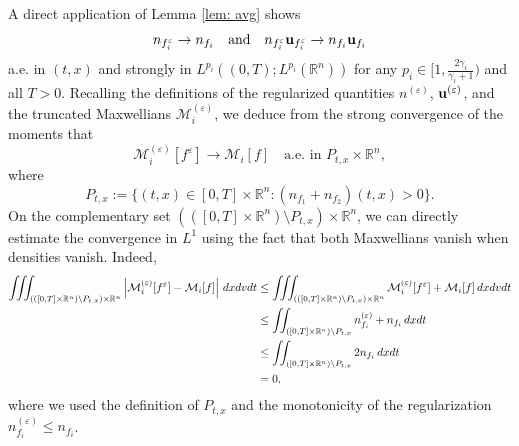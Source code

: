\documentclass[10pt,reqno]{amsart}
\numberwithin{equation}{section}
\newcommand{\R}{\mathbb R}
\newcommand{\calM}{\mathcal M}
\newcommand{\ve}{\varepsilon}
\begin{document}
A direct application of Lemma \ref{lem: avg} shows
\[
   n_{f_i^\ve} \to n_{f_i} \quad \mbox{and} \quad n_{f_i^\ve} {\bf{u}}_{f_i^\ve} \to n_{f_i} {\bf{u}}_{f_i}
\]
a.e. in $(t,x)$ and strongly in $L^{p_i}((0,T);L^{p_i}(\R^n))$ for any $p_i \in [1,\frac{2\gamma_i}{\gamma_i + 1})$ and all $T>0$. Recalling the definitions of the regularized quantities $n^{(\ve)}$, ${\bf{u}}^{(\ve)}$, and the truncated Maxwellians $\calM_i^{(\ve)}$, we deduce from the strong convergence of the moments that
\[
    \calM_i^{(\ve)}[f^\ve] \to \calM_i[f] \quad \text{a.e. in }P_{t,x} \times \R^n, 
\]
where 
\[
P_{t,x}:= \{(t,x)\in [0,T]\times\R^n: (n_{f_1} + n_{f_2})(t,x) > 0\}.
\]
On the complementary set $(([0,T]\times\R^n) \setminus P_{t,x}) \times \R^n$, we can directly estimate the convergence in $L^1$ using the fact that both Maxwellians vanish when densities vanish. Indeed,
    \begin{align*}
      \iiint_{(([0,T]\times\R^n) \setminus P_{t,x}) \times \R^n} \left|\calM_i^{(\ve)}[f^\ve] - \calM_i[f]\right|\, dxdvdt  
        &\le \iiint_{(([0,T]\times\R^n) \setminus P_{t,x}) \times \R^n} \calM_i^{(\ve)}[f^\ve] + \calM_i[f]\, dxdvdt \\
        &\le \iint_{([0,T]\times\R^n)\setminus P_{t,x}} n_{f_i}^{(\ve)} + n_{f_i} \, dxdt \\
        &\le \iint_{([0,T]\times\R^n)\setminus P_{t,x}} 2n_{f_i} \,dxdt \cr
        &=0,
    \end{align*}
 where we used the definition of $P_{t,x}$ and the monotonicity of the regularization $n_{f_i}^{(\ve)} \le n_{f_i}$.
    
\end{document}
